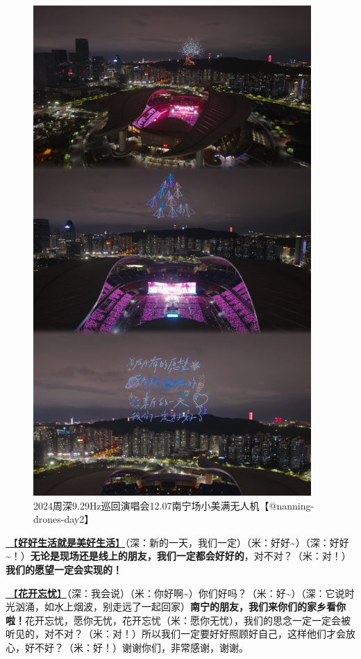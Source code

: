 \documentclass[]{ctexbook}
\begin{document}
\begin{figure}

{\centering \includegraphics[width=300pt]{img/nanning20241207/001} 

}

\caption{2024周深9.29Hz巡回演唱会12.07南宁场小美满无人机【@nanning-drones-day2】}\label{fig:unnamed-chunk-161}
\end{figure}

\hyperref[live-happy-life-happy]{🎵【\textbf{好好生活就是美好生活}】}（深：新的一天，我们一定）（米：好好\textasciitilde）（深：好好\textasciitilde！）\textbf{无论是现场还是线上的朋友，我们一定都会好好的}，对不对？（米：对！）\textbf{我们的愿望一定会实现的！}

\hyperref[no-worries]{🎵【\textbf{花开忘忧}】}（深：我会说）（米：你好啊\textasciitilde）你们好吗？（米：好\textasciitilde）（深：它说时光汹涌，如水上烟波，别走远了一起回家）\textbf{南宁的朋友，我们来你们的家乡看你啦！}花开忘忧，愿你无忧，花开忘忧（米：愿你无忧），我们的思念一定一定会被听见的，对不对？（米：对！）所以我们一定要好好照顾好自己，这样他们才会放心，好不好？（米：好！）谢谢你们，非常感谢，谢谢。
\end{document}
